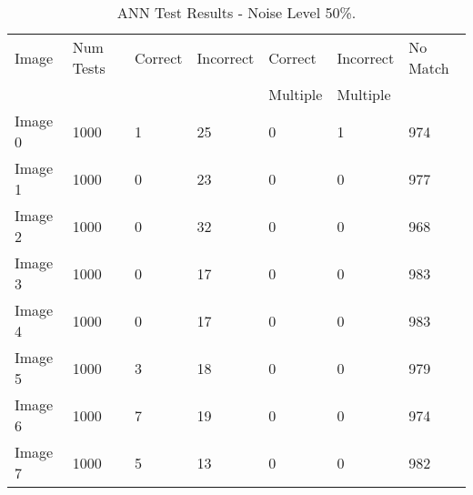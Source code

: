 \begin{table}[tbh]
\caption{ANN Test Results - Noise Level 50\%. \label{table:ann50}}
\begin{center}
\begin{tabular}{|l|l|l|l|l|l|l|}
  \hline
  Image & Num Tests & Correct & Incorrect & Correct & Incorrect & No Match \\
  &&&&Multiple&Multiple&\\
 \hline
  Image 0 & 1000 & 1 & 25 & 0 & 1 & 974\\
\hline
  Image 1 & 1000 & 0 & 23 & 0 & 0 & 977 \\ 
\hline
  Image 2 & 1000 & 0 & 32 & 0 & 0 & 968 \\
\hline
  Image 3 & 1000 & 0 & 17 & 0 & 0 & 983\\
\hline
  Image 4 &1000 & 0 & 17 & 0 & 0 & 983 \\
\hline
  Image 5 &1000 & 3 & 18 & 0 & 0 & 979 \\
\hline
  Image 6 & 1000 & 7 & 19 & 0 & 0 & 974\\
\hline
  Image 7 & 1000 & 5 & 13 & 0 & 0 & 982\\
  \hline
\end{tabular}
\end{center}
\end{table}
